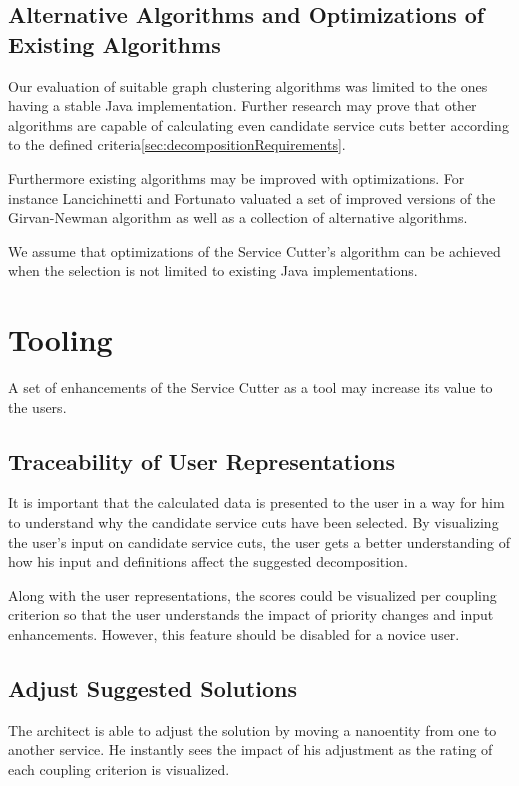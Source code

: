 \subsection{Alternative Algorithms and Optimizations of Existing Algorithms}

Our evaluation of suitable graph clustering algorithms was limited to the ones having a stable Java implementation. Further research may prove that other algorithms are capable of calculating even candidate service cuts better according to the defined criteria\ref{sec:decompositionRequirements}.

Furthermore existing algorithms may be improved with optimizations. For instance Lancichinetti and Fortunato\cite{lancichinetti2009community} valuated a set of improved versions of the Girvan-Newman algorithm as well as a collection of alternative algorithms.

We assume that optimizations of the Service Cutter's algorithm can be achieved when the selection is not limited to existing Java implementations.

\section{Tooling}

A set of enhancements of the Service Cutter as a tool may increase its value to the users.

\subsection{Traceability of User Representations}

It is important that the calculated data is presented to the user in a way for him to understand why the candidate service cuts have been selected. By visualizing the user's input on candidate service cuts, the user gets a better understanding of how his input and definitions affect the suggested decomposition. 

Along with the user representations, the scores could be visualized per coupling criterion so that the user understands the impact of priority changes and input enhancements. However, this feature should be disabled for a novice user. 

\subsection{Adjust Suggested Solutions}

The architect is able to adjust the solution by moving a nanoentity from one to another service. He instantly sees the impact of his adjustment as the rating of each coupling criterion is visualized.

